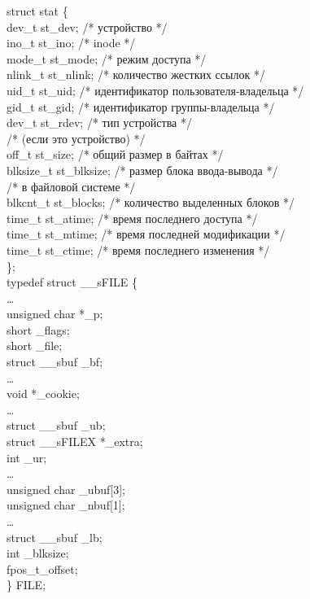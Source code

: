\documentclass[14pt, a4paper]{extarticle}
\begin{document}
\newpage
struct stat \{\\
	dev\_t st\_dev; /* устройство */ \\
	ino\_t st\_ino; /* inode */\\
	mode\_t st\_mode; /* режим доступа */\\
	nlink\_t st\_nlink; /* количество жестких ссылок */\\
	uid\_t st\_uid; /* идентификатор пользователя-владельца */\\
	gid\_t st\_gid; /* идентификатор группы-владельца */\\
	dev\_t st\_rdev; /* тип устройства */\\
	/* (если это устройство) */\\
	off\_t st\_size; /* общий размер в байтах */\\
	blksize\_t st\_blksize; /* размер блока ввода-вывода */\\
	/* в файловой системе */\\
	blkcnt\_t st\_blocks; /* количество выделенных блоков */\\
	time\_t st\_atime; /* время последнего доступа */\\
	time\_t st\_mtime; /* время последней модификации */\\
	time\_t st\_ctime; /* время последнего изменения */\\
\};\\

\newpage
typedef struct \_\_sFILE \{\\
	…\\
	unsigned char *\_p;\\
	short \_flags;\\
	short \_file;\\
	struct \_\_sbuf \_bf;\\
	…\\
	void *\_cookie;\\
	…\\
	struct \_\_sbuf \_ub;\\
	struct \_\_sFILEX *\_extra;\\
	int \_ur;\\
	…\\
	unsigned char \_ubuf[3];\\
	unsigned char \_nbuf[1];\\
	…\\
	struct \_\_sbuf \_lb;\\
	int \_blksize;\\
	fpos\_t\_offset;\\
\} FILE;\\
\end{document}
